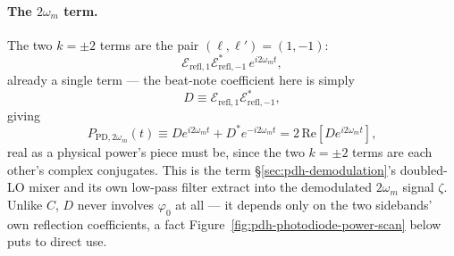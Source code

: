 \documentclass[9pt]{article}
\begin{document}
\paragraph{The $2\omega_m$ term.} The two $k=\pm2$ terms are the pair
$(\ell,\ell')=(1,-1)$:
\[
\mathcal{E}_{\mathrm{refl},1}\mathcal{E}_{\mathrm{refl},-1}^*\,e^{i2\omega_m t},
\]
already a single term --- the beat-note coefficient here is simply
\begin{equation}
D \equiv \mathcal{E}_{\mathrm{refl},1}\mathcal{E}_{\mathrm{refl},-1}^*,
\label{eq:pdh-2omega-coefficient}
\end{equation}
giving
\begin{equation}
P_{\mathrm{PD},2\omega_m}(t) \equiv De^{i2\omega_m t}+D^*e^{-i2\omega_m t} = 2\,\mathrm{Re}\!\left[De^{i2\omega_m t}\right],
\label{eq:pdh-pd-2omega-term}
\end{equation}
real as a physical power's piece must be, since the two $k=\pm2$ terms are
each other's complex conjugates. This is the term \S\ref{sec:pdh-demodulation}'s
doubled-LO mixer and its own low-pass filter extract into the demodulated
$2\omega_m$ signal $\zeta$. Unlike $C$, $D$
never involves $\varphi_0$ at all --- it depends only on the two
sidebands' own reflection coefficients, a fact
Figure~\ref{fig:pdh-photodiode-power-scan} below puts to direct use.
\end{document}

